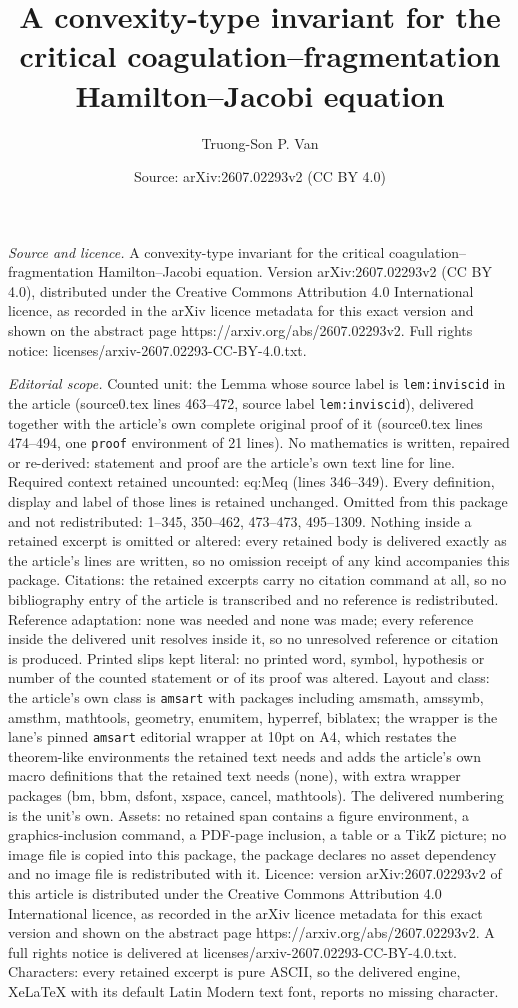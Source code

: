 \documentclass[10pt,a4paper]{amsart}
\title[A convexity-type invariant for the critical coagulation--fra]{A convexity-type invariant for the critical coagulation--fragmentation Hamilton--Jacobi equation}
\author{Truong-Son P. Van}
\date{Source: arXiv:2607.02293v2 (CC BY 4.0)}
\begin{document}
\maketitle

\noindent\emph{Source and licence.} A convexity-type invariant for the critical coagulation--fragmentation Hamilton--Jacobi equation. Version arXiv:2607.02293v2 (CC BY 4.0), distributed under the Creative Commons Attribution 4.0 International licence, as recorded in the arXiv licence metadata for this exact version and shown on the abstract page https://arxiv.org/abs/2607.02293v2. Full rights notice: licenses/arxiv-2607.02293-CC-BY-4.0.txt.\par\smallskip

\noindent\textit{Editorial scope.} Counted unit: the Lemma whose source label is \texttt{lem:inviscid} in the article (source0.tex lines 463--472, source label \texttt{lem:inviscid}), delivered together with the article's own complete original proof of it (source0.tex lines 474--494, one \texttt{proof} environment of 21 lines). No mathematics is written, repaired or re-derived: statement and proof are the article's own text line for line. Required context retained uncounted: eq:Meq (lines 346--349). Every definition, display and label of those lines is retained unchanged. Omitted from this package and not redistributed: 1--345, 350--462, 473--473, 495--1309. Nothing inside a retained excerpt is omitted or altered: every retained body is delivered exactly as the article's lines are written, so no omission receipt of any kind accompanies this package. Citations: the retained excerpts carry no citation command at all, so no bibliography entry of the article is transcribed and no reference is redistributed. Reference adaptation: none was needed and none was made; every reference inside the delivered unit resolves inside it, so no unresolved reference or citation is produced. Printed slips kept literal: no printed word, symbol, hypothesis or number of the counted statement or of its proof was altered. Layout and class: the article's own class is \texttt{amsart} with packages including amsmath, amssymb, amsthm, mathtools, geometry, enumitem, hyperref, biblatex; the wrapper is the lane's pinned \texttt{amsart} editorial wrapper at 10pt on A4, which restates the theorem-like environments the retained text needs and adds the article's own macro definitions that the retained text needs (none), with extra wrapper packages (bm, bbm, dsfont, xspace, cancel, mathtools). The delivered numbering is the unit's own. Assets: no retained span contains a figure environment, a graphics-inclusion command, a PDF-page inclusion, a table or a TikZ picture; no image file is copied into this package, the package declares no asset dependency and no image file is redistributed with it. Licence: version arXiv:2607.02293v2 of this article is distributed under the Creative Commons Attribution 4.0 International licence, as recorded in the arXiv licence metadata for this exact version and shown on the abstract page https://arxiv.org/abs/2607.02293v2. A full rights notice is delivered at licenses/arxiv-2607.02293-CC-BY-4.0.txt. Characters: every retained excerpt is pure ASCII, so the delivered engine, XeLaTeX with its default Latin Modern text font, reports no missing character.
\end{document}

